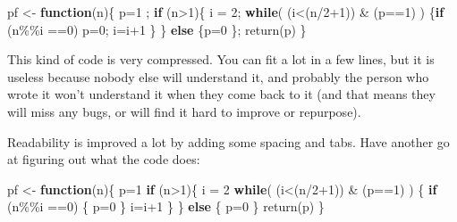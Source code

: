 \documentclass[
  12pt,
  a5paper,
]{book}
\newenvironment{Shaded}{\begin{snugshade}}{\end{snugshade}}
\newcommand{\ControlFlowTok}[1]{\textcolor[rgb]{0.13,0.29,0.53}{\textbf{#1}}}
\newcommand{\DecValTok}[1]{\textcolor[rgb]{0.00,0.00,0.81}{#1}}
\newcommand{\FunctionTok}[1]{\textcolor[rgb]{0.00,0.00,0.00}{#1}}
\newcommand{\NormalTok}[1]{#1}
\newcommand{\OtherTok}[1]{\textcolor[rgb]{0.56,0.35,0.01}{#1}}
\newcommand{\SpecialCharTok}[1]{\textcolor[rgb]{0.00,0.00,0.00}{#1}}
\begin{document}
\begin{Shaded}
\begin{Highlighting}[]
\NormalTok{pf }\OtherTok{\textless{}{-}} \ControlFlowTok{function}\NormalTok{(n)\{ p}\OtherTok{=}\DecValTok{1}\NormalTok{ ; }\ControlFlowTok{if}\NormalTok{ (n}\SpecialCharTok{\textgreater{}}\DecValTok{1}\NormalTok{)\{ i }\OtherTok{=} \DecValTok{2}\NormalTok{; }\ControlFlowTok{while}\NormalTok{( (i}\SpecialCharTok{\textless{}}\NormalTok{(n}\SpecialCharTok{/}\DecValTok{2}\SpecialCharTok{+}\DecValTok{1}\NormalTok{)) }\SpecialCharTok{\&}\NormalTok{ (p}\SpecialCharTok{==}\DecValTok{1}\NormalTok{) ) \{}\ControlFlowTok{if}\NormalTok{ (n}\SpecialCharTok{\%\%}\NormalTok{i }\SpecialCharTok{==}\DecValTok{0}\NormalTok{) p}\OtherTok{=}\DecValTok{0}\NormalTok{; i}\OtherTok{=}\NormalTok{i}\SpecialCharTok{+}\DecValTok{1}\NormalTok{ \}  \} }\ControlFlowTok{else}\NormalTok{ \{p}\OtherTok{=}\DecValTok{0}\NormalTok{ \}; }\FunctionTok{return}\NormalTok{(p) \}}
\end{Highlighting}
\end{Shaded}

This kind of code is very compressed. You can fit a lot in a few lines, but it is useless because nobody else will understand it, and probably the person who wrote it won't understand it when they come back to it (and that means they will miss any bugs, or will find it hard to improve or repurpose).

Readability is improved a lot by adding some spacing and tabs. Have another go at figuring out what the code does:

\begin{Shaded}
\begin{Highlighting}[]
\NormalTok{pf }\OtherTok{\textless{}{-}} \ControlFlowTok{function}\NormalTok{(n)\{}
\NormalTok{  p}\OtherTok{=}\DecValTok{1}
  \ControlFlowTok{if}\NormalTok{ (n}\SpecialCharTok{\textgreater{}}\DecValTok{1}\NormalTok{)\{ }
\NormalTok{    i }\OtherTok{=} \DecValTok{2} 
      \ControlFlowTok{while}\NormalTok{( (i}\SpecialCharTok{\textless{}}\NormalTok{(n}\SpecialCharTok{/}\DecValTok{2}\SpecialCharTok{+}\DecValTok{1}\NormalTok{)) }\SpecialCharTok{\&}\NormalTok{ (p}\SpecialCharTok{==}\DecValTok{1}\NormalTok{) ) \{}
        \ControlFlowTok{if}\NormalTok{ (n}\SpecialCharTok{\%\%}\NormalTok{i }\SpecialCharTok{==}\DecValTok{0}\NormalTok{) \{}
\NormalTok{          p}\OtherTok{=}\DecValTok{0}
\NormalTok{        \}}
\NormalTok{        i}\OtherTok{=}\NormalTok{i}\SpecialCharTok{+}\DecValTok{1}
\NormalTok{      \}}
\NormalTok{  \} }\ControlFlowTok{else}\NormalTok{ \{}
\NormalTok{    p}\OtherTok{=}\DecValTok{0}
\NormalTok{  \}}
  \FunctionTok{return}\NormalTok{(p)}
\NormalTok{\}}
\end{Highlighting}
\end{Shaded}
\end{document}
